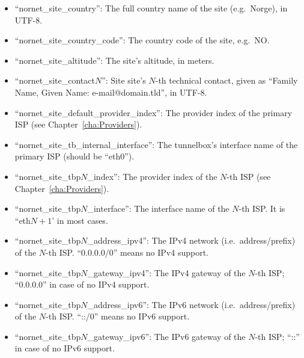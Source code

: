 \begin{itemize}
 \item ``nornet\_site\_country'': The full country name of the site (e.g.\ Norge), in UTF-8.
 
 \item ``nornet\_site\_country\_code'': The country code of the site, e.g.\ NO.
 
 \item ``nornet\_site\_altitude'': The site's altitude, in meters.
 
 \item ``nornet\_site\_contact$N$'': Site site's $N$-th technical contact, given as ``Family Name, Given Name: e-mail@domain.tld'', in UTF-8.
 
 \item ``nornet\_site\_default\_provider\_index'': The provider index of the primary ISP (see Chapter~\ref{cha:Providers}).
 
 \item ``nornet\_site\_tb\_internal\_interface'': The tunnelbox's interface name of the primary ISP (should be ``eth0'').

 
 \item ``nornet\_site\_tbp$N$\_index'': The provider index of the $N$-th ISP (see Chapter~\ref{cha:Providers}).
 
 \item ``nornet\_site\_tbp$N$\_interface'': The interface name of the $N$-th ISP. It is ``eth$N+1$' in most cases.

 \item ``nornet\_site\_tbp$N$\_address\_ipv4'': The IPv4 network (i.e.\ address/prefix) of the $N$-th ISP. ``0.0.0.0/0'' means no IPv4 support.
 
 \item ``nornet\_site\_tbp$N$\_gateway\_ipv4'': The IPv4 gateway of the $N$-th ISP; ``0.0.0.0'' in case of no IPv4 support.
 
 \item ``nornet\_site\_tbp$N$\_address\_ipv6'': The IPv6 network (i.e.\ address/prefix) of the $N$-th ISP. ``::/0'' means no IPv6 support.
 
 \item ``nornet\_site\_tbp$N$\_gateway\_ipv6'': The IPv6 gateway of the $N$-th ISP; ``::'' in case of no IPv6 support.
 

\end{itemize}
